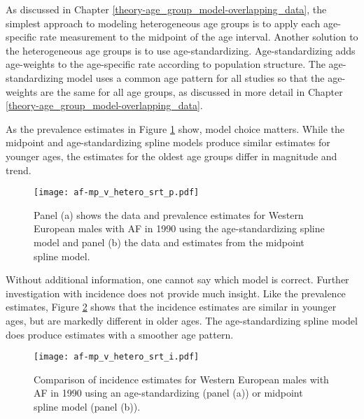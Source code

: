 As discussed in Chapter \ref{theory-age_group_model-overlapping_data},
the simplest approach to modeling heterogeneous age groups is to apply
each age-specific rate measurement to the midpoint of the age interval.
Another solution to the heterogeneous age groups is to use age-standardizing.
Age-standardizing adds age-weights to the age-specific rate according
to population structure.  The age-standardizing model uses a common
age pattern for all studies so that the age-weights are the same for
all age groups, as discussed in more detail in Chapter
\ref{theory-age_group_model-overlapping_data}.

As the prevalence estimates in Figure \ref{fig:app-af srt p} show, model
choice matters.  While the midpoint and age-standardizing spline models produce
similar estimates for younger ages, the estimates for the oldest age groups
differ in magnitude and trend.

    \begin{figure}[h]
        \begin{center}
            \texttt{[image: af-mp\_v\_hetero\_srt\_p.pdf]}
            \caption{Panel (a) shows the data and
              prevalence estimates for Western European
              males with AF in 1990 using the age-standardizing spline model 
              and panel (b) the data and estimates from the midpoint spline model.}
            \label{fig:app-af srt p}
        \end{center}
    \end{figure}

Without additional information, one cannot say which model is correct.
Further investigation with incidence does not provide much insight.  Like
the prevalence estimates, Figure \ref{fig:app-af srt i} shows that the
incidence estimates are similar in younger ages, but are markedly different
in older ages.  The age-standardizing spline model does produce estimates with a
smoother age pattern.

    \begin{figure}[h]
        \begin{center}
            \texttt{[image: af-mp\_v\_hetero\_srt\_i.pdf]}
            \caption{Comparison of incidence estimates for Western European
              males with AF in 1990 using an age-standardizing (panel (a))
              or midpoint spline model (panel (b)).}
            \label{fig:app-af srt i}
        \end{center}
    \end{figure}

